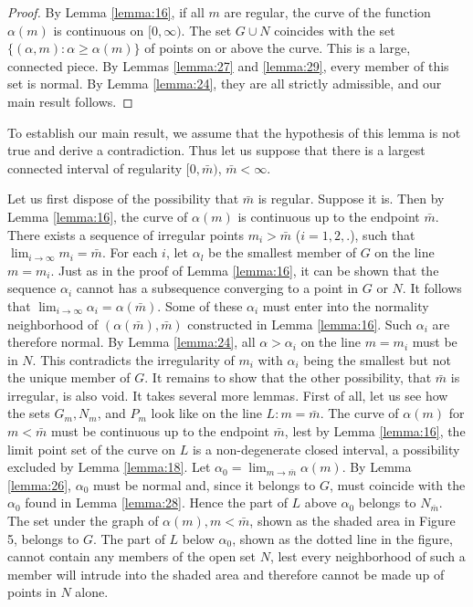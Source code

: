 \begin{proof}
  By Lemma \ref{lemma:16}, if all $m$ are regular, the curve of the function $\alpha(m)$
  is continuous on $[0, \infty)$.
  The set $G \cup N$ coincides with the set $\{(\alpha, m): \alpha \geq \alpha(m)\}$
  of points on or above the curve. This is a large, connected piece.
  By Lemmas \ref{lemma:27} and \ref{lemma:29}, every member of this set is normal.
  By Lemma \ref{lemma:24}, they are all strictly admissible, and our main result follows.
\end{proof}

To establish our main result, we assume that the hypothesis of this lemma is not true and derive a contradiction. Thus let us suppose that there is a largest connected interval of regularity $[0, \bar{m})$, $\bar{m}<\infty$.

Let us first dispose of the possibility that $\bar{m}$ is regular. Suppose it is.
Then by Lemma \ref{lemma:16}, the curve of $\alpha(m)$ is continuous up to the endpoint $\bar{m}$.
There exists a sequence of irregular points $m_i>\bar{m}$ ($i=1,2,.$),
such that $\lim_{i \rightarrow \infty} m_i=\bar{m}$.
For each $i$, let $\alpha_l$ be the smallest member of $G$ on the line $m=m_i$.
Just as in the proof of Lemma \ref{lemma:16}, it can be shown that the sequence $\alpha_i$ 
cannot has a subsequence converging to a point in $G$ or $N$. 
It follows that $\lim _{i \rightarrow \infty} \alpha_i=\alpha(\bar{m})$. 
Some of these $\alpha_i$ must enter into the normality neighborhood 
of $(\alpha(\bar{m}),\bar{m})$ constructed in Lemma \ref{lemma:16}. 
Such $\alpha_i$ are therefore normal. 
By Lemma \ref{lemma:24}, all $\alpha>\alpha_i$ on the line $m=m_i$ must be in $N$. 
This contradicts the irregularity of $m_i$ with $\alpha_i$ being the smallest 
but not the unique member of $G$. It remains to show that the other possibility,
that $\bar{m}$ is irregular, is also void. It takes several more lemmas.
First of all, let us see how the sets $G_m, N_m$,
and $P_m$ look like on the line $L: m=\bar{m}$.
The curve of $\alpha(m)$ for $m<\bar{m}$ must be continuous up to the endpoint $\bar{m}$,
lest by Lemma \ref{lemma:16}, the limit point set of the curve on $L$ is a non-degenerate closed interval, 
a possibility excluded by Lemma \ref{lemma:18}. Let $\alpha_0=\lim _{m \rightarrow \bar{m}} \alpha(m)$.
By Lemma \ref{lemma:26}, $\alpha_0$ must be normal and, since it belongs to $G$,
must coincide with the $\alpha_0$ found in Lemma \ref{lemma:28}.
Hence the part of $L$ above $\alpha_0$ belongs to $N_{\bar{m}}$.
The set under the graph of $\alpha(m), m<\bar{m}$, shown as the shaded area in Figure 5,
belongs to $G$. The part of $L$ below $\alpha_0$, shown as the dotted line in the figure, 
cannot contain any members of the open set $N$, lest every neighborhood of such a member will 
intrude into the shaded area and therefore cannot be made up of points in $N$ alone.

